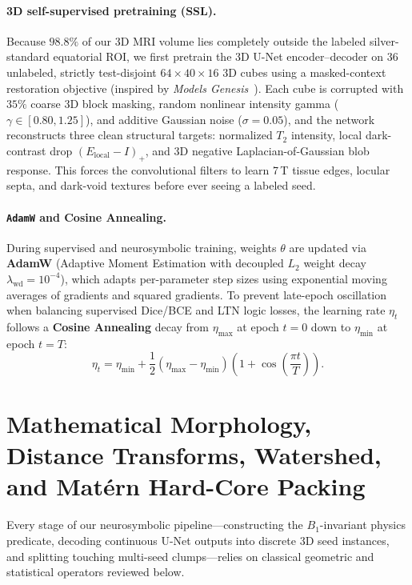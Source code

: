 \documentclass[10pt,a4paper]{article}
\renewcommand{\_}{\origunderscore\allowbreak}
\begin{document}
\paragraph{3D self-supervised pretraining (SSL).} Because $98.8\%$ of our 3D MRI volume lies completely outside the labeled silver-standard equatorial ROI, we first pretrain the 3D U-Net encoder--decoder on $36$ unlabeled, strictly test-disjoint $64\times 40\times 16$ 3D cubes using a masked-context restoration objective (inspired by \emph{Models Genesis}~\cite{zhou2021modelsgenesis}). Each cube is corrupted with $35\%$ coarse 3D block masking, random nonlinear intensity gamma ($\gamma \in [0.80, 1.25]$), and additive Gaussian noise ($\sigma = 0.05$), and the network reconstructs three clean structural targets: normalized $T_2$ intensity, local dark-contrast drop $(E_{\text{local}} - I)_+$, and 3D negative Laplacian-of-Gaussian blob response. This forces the convolutional filters to learn 7\,T tissue edges, locular septa, and dark-void textures before ever seeing a labeled seed.

\paragraph{\texttt{AdamW} and Cosine Annealing.} During supervised and neurosymbolic training, weights $\theta$ are updated via \textbf{AdamW} (Adaptive Moment Estimation with decoupled $L_2$ weight decay $\lambda_{\text{wd}} = 10^{-4}$), which adapts per-parameter step sizes using exponential moving averages of gradients and squared gradients. To prevent late-epoch oscillation when balancing supervised Dice/BCE and LTN logic losses, the learning rate $\eta_t$ follows a \textbf{Cosine Annealing} decay from $\eta_{\max}$ at epoch $t=0$ down to $\eta_{\min}$ at epoch $t=T$:
\begin{equation}
    \eta_t = \eta_{\min} + \frac{1}{2}(\eta_{\max} - \eta_{\min})\left(1 + \cos\!\left(\frac{\pi t}{T}\right)\right).
\end{equation}

\clearpage
\section[Morphology, Watershed \& Hard-Core Packing]{Mathematical Morphology, Distance Transforms, Watershed, and Mat\'ern Hard-Core Packing}
\label{app:morphology}

Every stage of our neurosymbolic pipeline---constructing the $B_1$-invariant physics predicate, decoding continuous U-Net outputs into discrete 3D seed instances, and splitting touching multi-seed clumps---relies on classical geometric and statistical operators reviewed below.
\end{document}
